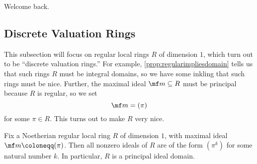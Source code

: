 
Welcome back.

\subsection{Discrete Valuation Rings}
This subsection will focus on regular local rings $R$ of dimension $1$, which turn out to be ``discrete valuation rings.'' For example, \autoref{prop:regularimpliesdomain} tells us that such rings $R$ must be integral domains, so we have some inkling that such rings must be nice. Further, the maximal ideal $\mf m\subseteq R$ must be principal because $R$ is regular, so we set
\[\mf m=(\pi)\]
for some $\pi\in R$. This turns out to make $R$ very nice.
\begin{proposition} \label{prop:altdvr}
	Fix a Noetherian regular local ring $R$ of dimension $1$, with maximal ideal $\mf m\coloneqq(\pi)$. Then all nonzero ideals of $R$ are of the form $\left(\pi^k\right)$ for some natural number $k$. In particular, $R$ is a principal ideal domain.
\end{proposition}
